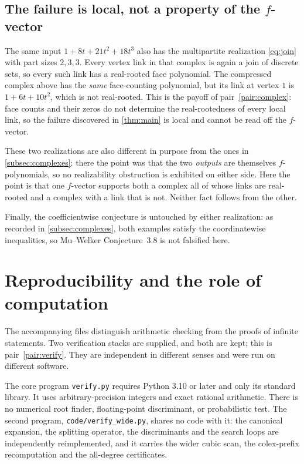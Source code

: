 \documentclass[11pt,letterpaper]{article}
\numberwithin{equation}{section}
\theoremstyle{definition}
\theoremstyle{remark}
\begin{document}
\subsection{The failure is local, not a property of the \texorpdfstring{$f$}{f}-vector}

The same input $1+8t+21t^2+18t^3$ also has the multipartite realization
\eqref{eq:join} with part sizes $2,3,3$. Every vertex link in that complex is
again a join of discrete sets, so every such link has a real-rooted face
polynomial. The compressed complex above has the \emph{same} face-counting
polynomial, but its link at vertex $1$ is $1+6t+10t^2$, which is not
real-rooted. This is the payoff of pair~\ref{pair:complex}: face counts and
their zeros do not determine the real-rootedness of every local link, so the
failure discovered in \cref{thm:main} is local and cannot be read off the
$f$-vector.

These two realizations are also different in purpose from the ones in
\cref{subsec:complexes}: there the point was that the two \emph{outputs} are
themselves $f$-polynomials, so no realizability obstruction is exhibited on
either side. Here the point is that one $f$-vector supports both a complex all
of whose links are real-rooted and a complex with a link that is not. Neither
fact follows from the other.

Finally, the coefficientwise conjecture is untouched by either realization: as
recorded in \cref{subsec:complexes}, both examples satisfy the coordinatewise
inequalities, so Mu--Welker Conjecture~3.8 is not falsified here.

\section{Reproducibility and the role of computation}\label{sec:verification}

The accompanying files distinguish arithmetic checking from the proofs of
infinite statements. Two verification stacks are supplied, and both are kept;
this is pair~\ref{pair:verify}. They are independent in different senses and
were run on different software.

The core program \texttt{verify.py} requires Python
3.10 or later and only its standard library. It uses arbitrary-precision
integers and exact rational arithmetic. There is no numerical root finder,
floating-point discriminant, or probabilistic test. The second program,
\texttt{code/verify\_wide.py}, shares no code with it: the canonical
expansion, the splitting operator, the discriminants and the search loops are
independently reimplemented, and it carries the wider cubic scan, the
colex-prefix recomputation and the all-degree certificates.
\end{document}
